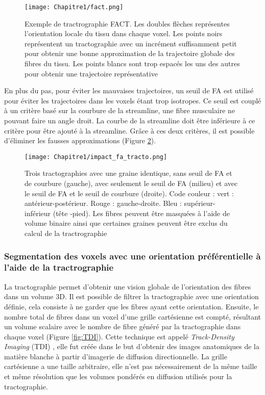 \begin{figure}[!h]
  \begin{center}
    \texttt{[image: Chapitre1/fact.png]}
     \end{center}
    \caption{Exemple de tractrographie FACT. Les doubles flèches représentes l’orientation locale du tissu dans chaque voxel. Les points noirs représentent un tractographie avec un incrément suffisamment petit pour obtenir une bonne approximation de la trajectoire globale des fibres du tissu. Les points blancs sont trop espacés les uns des autres pour obtenir une trajectoire représentative}
  \label{fig:FACT}
\end{figure}
\clearpage

En plus du pas, pour éviter les mauvaises trajectoires, un seuil de FA est utilisé pour éviter les trajectoires dans les voxels étant trop isotropes. Ce seuil est couplé à un critère basé sur la courbure de la streamline, une fibre musculaire ne pouvant faire un angle droit. La courbe de la streamline doit être inférieure à ce critère pour être ajouté à la streamline. Grâce à ces deux critères, il est possible d’éliminer les fausses approximations (Figure \ref{fig:impact_FA}).

 \begin{figure}[!h]
  \begin{center}
    \texttt{[image: Chapitre1/impact\_fa\_tracto.png]}
     \end{center}
    \caption{Trois tractographies avec une graine identique, sans seuil de FA et de courbure (gauche), avec seulement le seuil de FA (milieu) et avec le seuil de FA et le seuil de courbure (droite). Code couleur : vert : antérieur-postérieur. Rouge : gauche-droite. Bleu : supérieur-inférieur (tête -pied).
Les fibres peuvent être masquées à l’aide de volume binaire ainsi que certaines graines peuvent être exclus du calcul de la tractrographie}
  \label{fig:impact_FA}
\end{figure}

\clearpage
\subsubsection{Segmentation des voxels avec une orientation préférentielle à l’aide de la tractrographie}


La tractographie permet d’obtenir une vision globale de l’orientation des fibres dans un volume 3D. Il est possible de filtrer la tractographie avec une orientation définie, cela consiste à ne garder que les fibres ayant cette orientation. Ensuite, le nombre total de fibres dans un voxel d’une grille cartésienne est compté, résultant un volume scalaire avec le nombre de fibre généré par la tractographie dans chaque voxel (Figure \ref{fig:TDI}). Cette technique est appelé \textit{Track-Density Imaging} (TDI) \cite{Calamante2010}, elle fut créée dans le but d’obtenir des images anatomiques de la matière blanche à partir d’imagerie de diffusion directionnelle. La grille cartésienne a une taille arbitraire, elle n’est pas nécessairement de la même taille et même résolution que les volumes pondérés en diffusion utilisés pour la tractographie.


